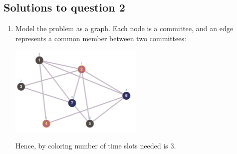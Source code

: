 \documentclass{article}
\begin{document}
\subsection*{Solutions to question 2}

\begin{enumerate}[label=(\alph*)]
    \item Model the problem as a graph. Each node is a committee, and an edge represents a common member between two committees:

          \includegraphics[width=0.5\textwidth]{5-2-a.png}


          Hence, by coloring number of time slots needed is 3.


\end{enumerate}
\end{document}
